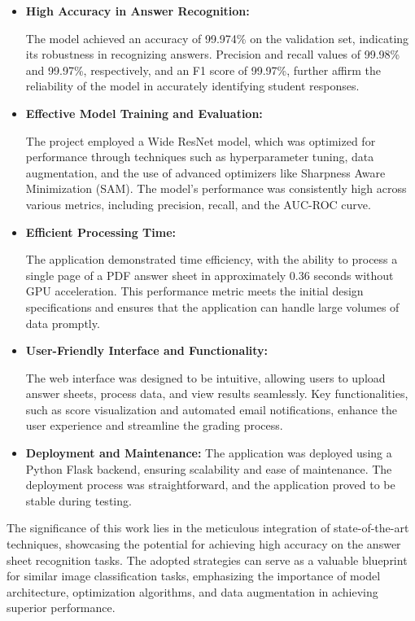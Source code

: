 \documentclass[twocolumn]{article}
\begin{document}
\begin{itemize}
    \item \textbf{High Accuracy in Answer Recognition:} 
    
    The model achieved an accuracy of 99.974\% on the validation set, indicating its robustness in recognizing answers. Precision and recall values of 99.98\% and 99.97\%, respectively, and an F1 score of 99.97\%, further affirm the reliability of the model in accurately identifying student responses.

    \item \textbf{Effective Model Training and Evaluation:} 
    
    The project employed a Wide ResNet model, which was optimized for performance through techniques such as hyperparameter tuning, data augmentation, and the use of advanced optimizers like Sharpness Aware Minimization (SAM). The model's performance was consistently high across various metrics, including precision, recall, and the AUC-ROC curve.

    \item \textbf{Efficient Processing Time:} 
    
    The application demonstrated time efficiency, with the ability to process a single page of a PDF answer sheet in approximately 0.36 seconds without GPU acceleration. This performance metric meets the initial design specifications and ensures that the application can handle large volumes of data promptly.

    \item \textbf{User-Friendly Interface and Functionality:} 
    
    The web interface was designed to be intuitive, allowing users to upload answer sheets, process data, and view results seamlessly. Key functionalities, such as score visualization and automated email notifications, enhance the user experience and streamline the grading process.

    \item \textbf{Deployment and Maintenance:} The application was deployed using a Python Flask backend, ensuring scalability and ease of maintenance. The deployment process was straightforward, and the application proved to be stable during testing.
\end{itemize}

The significance of this work lies in the meticulous integration of state-of-the-art techniques, showcasing the potential for achieving high accuracy on the answer sheet recognition tasks. The adopted strategies can serve as a valuable blueprint for similar image classification tasks, emphasizing the importance of model architecture, optimization algorithms, and data augmentation in achieving superior performance.
\end{document}
